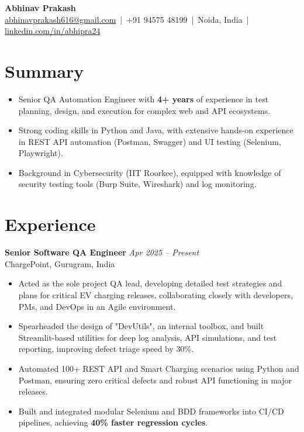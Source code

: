 \documentclass[a4paper,10pt]{article}
\begin{document}
\begin{center}
    {\Huge \textbf{Abhinav Prakash}}\\[4pt]
    \href{mailto:abhinavprakash616@gmail.com}{abhinavprakash616@gmail.com} \,|\, 
    +91 94575 48199 \,|\, 
    Noida, India \,|\, 
    \href{https://linkedin.com/in/abhipra24}{linkedin.com/in/abhipra24}
\end{center}

\section{Summary}
\begin{itemize}
    \item Senior QA Automation Engineer with \textbf{4+ years} of experience in test planning, design, and execution for complex web and API ecosystems.
    \item Strong coding skills in Python and Java, with extensive hands-on experience in REST API automation (Postman, Swagger) and UI testing (Selenium, Playwright).
    \item Background in Cybersecurity (IIT Roorkee), equipped with knowledge of security testing tools (Burp Suite, Wireshark) and log monitoring. 
\end{itemize}

\section{Experience}

\textbf{Senior Software QA Engineer} \hfill \textit{Apr 2025 – Present}\\
ChargePoint, Gurugram, India
\begin{itemize}
    \item Acted as the sole project QA lead, developing detailed test strategies and plans for critical EV charging releases, collaborating closely with developers, PMs, and DevOps in an Agile environment.
    \item Spearheaded the design of "DevUtils", an internal toolbox, and built Streamlit-based utilities for deep log analysis, API simulations, and test reporting, improving defect triage speed by 30\%.
    \item Automated 100+ REST API and Smart Charging scenarios using Python and Postman, ensuring zero critical defects and robust API functioning in major releases.
    \item Built and integrated modular Selenium and BDD frameworks into CI/CD pipelines, achieving \textbf{40\% faster regression cycles}.
\end{itemize}
\end{document}
